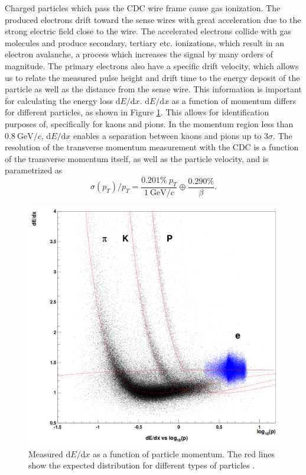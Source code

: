 \documentclass[headings=standardclasses,headings=big,oneside,a4paper,openany,12pt]{scrbook}
\newcommand {\e}[1]{\mathrm{~#1}}
\begin{document}
Charged particles which pass the CDC wire frame cause gas ionization. The produced electrons drift toward the sense wires with great acceleration due to the strong electric field close to the wire. The accelerated electrons collide with gas molecules and produce secondary, tertiary etc. ionizations, which result in an electron avalanche, a process which increases the signal by many orders of magnitude. The primary electrons also have a specific drift velocity, which allows us to relate the measured pulse height and drift time to the energy deposit of the particle as well as the distance from the sense wire. This information is important for calculating the energy loss $\mathrm{d}E/\mathrm{d}x$. $\mathrm{d}E/\mathrm{d}x$ as a function of momentum differs for different particles, as shown in Figure \ref{fig:dEdx}. This allows for identification purposes of, specifically for kaons and pions. In the momentum region less than $0.8\e{GeV}/c$, $\mathrm{d}E/\mathrm{d}x$ enables a separation between kaons and pions up to $3\sigma$. The resolution of the transverse momentum measurement with the CDC is a function of the transverse momentum itself, as well as the particle velocity, and is parametrized as
\begin{equation}
\sigma(p_T)/p_T = \frac{0.201\%~p_T}{1\e{GeV}/c} \oplus \frac{0.290\%}{\beta}.
\end{equation}

\begin{figure}[H]
	\centering
	\captionsetup{width=0.8\linewidth}
	\includegraphics[width=0.6\linewidth]{fig/setup/dEdx}
	\caption{Measured $\mathrm{d}E/\mathrm{d}x$ as a function of particle momentum. The red lines show the expected distribution for different types of particles \cite{ABASHIAN2002117}.}
	\label{fig:dEdx}
\end{figure}
\end{document}

